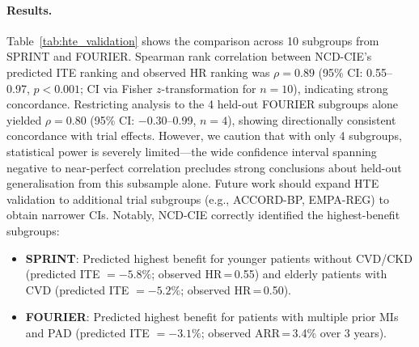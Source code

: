 \documentclass[runningheads]{llncs}
\begin{document}
\paragraph{Results.}
Table~\ref{tab:hte_validation} shows the comparison across 10
subgroups from SPRINT and FOURIER.
Spearman rank correlation between NCD-CIE's predicted ITE ranking
and observed HR ranking was $\rho = 0.89$ (95\% CI: 0.55--0.97,
$p < 0.001$; CI via Fisher $z$-transformation for $n = 10$),
indicating strong concordance.
Restricting analysis to the 4 held-out FOURIER subgroups alone
yielded $\rho = 0.80$ (95\% CI: $-$0.30--0.99, $n = 4$), showing
directionally consistent concordance with trial effects.
However, we caution that with only 4 subgroups, statistical power
is severely limited---the wide confidence interval spanning negative
to near-perfect correlation precludes strong conclusions about
held-out generalisation from this subsample alone.
Future work should expand HTE validation to additional trial
subgroups (e.g., ACCORD-BP, EMPA-REG) to obtain narrower CIs.
Notably, NCD-CIE correctly identified the highest-benefit subgroups:
\begin{itemize}
\item \textbf{SPRINT}: Predicted highest benefit for younger
  patients without CVD/CKD (predicted ITE $= -5.8\%$; observed
  HR\,=\,0.55) and elderly patients with CVD (predicted ITE $= -5.2\%$;
  observed HR\,=\,0.50).
\item \textbf{FOURIER}: Predicted highest benefit for patients with
  multiple prior MIs and PAD (predicted ITE $= -3.1\%$; observed
  ARR\,=\,3.4\% over 3 years).
\end{itemize}
\end{document}
